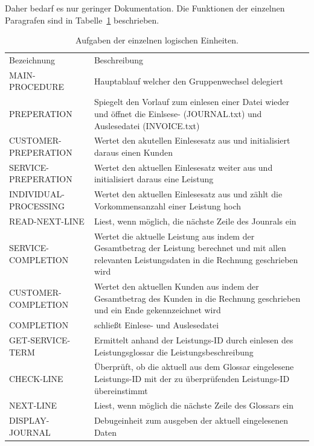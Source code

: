 Daher bedarf es nur geringer Dokumentation.
Die Funktionen der einzelnen Paragrafen sind in Tabelle~\ref{tab:prog-strukt} beschrieben.


\begin{table}[!htb]
    \centering
    \begin{tabularx}{\textwidth}{X | X }
       \rowcolor{fhfarbe!25}
       Bezeichnung                             & Beschreibung             \\
       \rowcolor{fhfarbe!10}
       MAIN-PROCEDURE & Hauptablauf welcher den Gruppenwechsel delegiert \\
       PREPERATION & Spiegelt den Vorlauf zum einlesen einer Datei wieder und öffnet die Einlsese- (JOURNAL.txt) und Auslesedatei (INVOICE.txt) \\
       CUSTOMER-PREPERATION & Wertet den akutellen Einlesesatz aus und initialisiert daraus einen Kunden \\
       SERVICE-PREPERATION & Wertet den aktuellen Einlesesatz weiter aus und initialisiert daraus eine Leistung \\
       INDIVIDUAL-PROCESSING & Wertet den aktuellen Einlesesatz aus und zählt die Vorkommensanzahl einer Leistung hoch \\
       READ-NEXT-LINE & Liest, wenn möglich, die nächste Zeile des Jounrals ein \\
       SERVICE-COMPLETION & Wertet die aktuelle Leistung aus indem der Gesamtbetrag der Leistung berechnet und mit allen relevanten Leistungsdaten in die Rechnung geschrieben wird \\
       CUSTOMER-COMPLETION & Wertet den aktuellen Kunden aus indem der Gesamtbetrag des Kunden in die Rechnung geschrieben und ein Ende gekennzeichnet wird \\
       COMPLETION & schließt Einlese- und Auslesedatei \\
       
       \rowcolor{fhfarbe!10}
       GET-SERVICE-TERM & Ermittelt anhand der Leistungs-ID durch einlesen des Leistungsglossar die Leistungsbeschreibung \\
       CHECK-LINE & Überprüft, ob die aktuell aus dem Glossar eingelesene Leistungs-ID mit der zu überprüfenden Leistungs-ID übereinstimmt \\
       NEXT-LINE & Liest, wenn möglich die nächste Zeile des Glossars ein\\
       DISPLAY-JOURNAL & Debugeinheit zum ausgeben der aktuell eingelesenen Daten \\
    \end{tabularx}
    \caption{Aufgaben der einzelnen logischen Einheiten.}\label{tab:prog-strukt}
\end{table}
